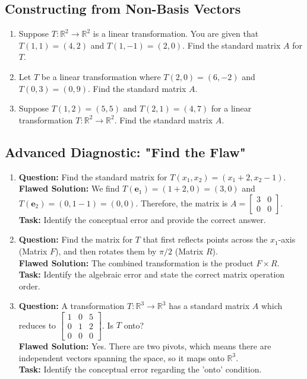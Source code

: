 \documentclass[12pt]{article}
\begin{document}
\subsection*{Constructing from Non-Basis Vectors}
\begin{enumerate}[resume]
    \item Suppose $T: \mathbb{R}^2 \rightarrow \mathbb{R}^2$ is a linear transformation. You are given that $T(1, 1) = (4, 2)$ and $T(1, -1) = (2, 0)$. Find the standard matrix $A$ for $T$.
    
    \item Let $T$ be a linear transformation where $T(2, 0) = (6, -2)$ and $T(0, 3) = (0, 9)$. Find the standard matrix $A$.
    
    \item Suppose $T(1, 2) = (5, 5)$ and $T(2, 1) = (4, 7)$ for a linear transformation $T: \mathbb{R}^2 \rightarrow \mathbb{R}^2$. Find the standard matrix $A$.
\end{enumerate}

\subsection*{Advanced Diagnostic: "Find the Flaw"}
\begin{enumerate}[resume]
    \item \textbf{Question:} Find the standard matrix for $T(x_1, x_2) = (x_1 + 2, x_2 - 1)$. \\
    \textbf{Flawed Solution:} We find $T(\mathbf{e}_1) = (1+2, 0) = (3, 0)$ and $T(\mathbf{e}_2) = (0, 1-1) = (0, 0)$. Therefore, the matrix is $A = \begin{bmatrix} 3 & 0 \\ 0 & 0 \end{bmatrix}$. \\
    \textbf{Task:} Identify the conceptual error and provide the correct answer.
    
    \item \textbf{Question:} Find the matrix for $T$ that first reflects points across the $x_1$-axis (Matrix $F$), and then rotates them by $\pi/2$ (Matrix $R$). \\
    \textbf{Flawed Solution:} The combined transformation is the product $F \times R$. \\
    \textbf{Task:} Identify the algebraic error and state the correct matrix operation order.
    
    \item \textbf{Question:} A transformation $T: \mathbb{R}^3 \rightarrow \mathbb{R}^3$ has a standard matrix $A$ which reduces to $\begin{bmatrix} 1 & 0 & 5 \\ 0 & 1 & 2 \\ 0 & 0 & 0 \end{bmatrix}$. Is $T$ onto? \\
    \textbf{Flawed Solution:} Yes. There are two pivots, which means there are independent vectors spanning the space, so it maps onto $\mathbb{R}^3$. \\
    \textbf{Task:} Identify the conceptual error regarding the 'onto' condition.
\end{enumerate}
\end{document}
